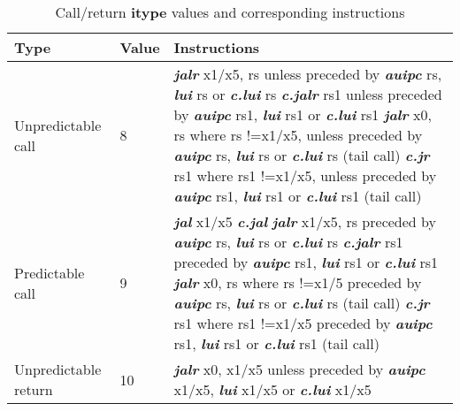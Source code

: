\begin{table}[htp]
    \centering
    \caption{Call/return \textbf{itype} values and corresponding instructions}
    \label{tab:itype}
    \begin{tabulary}{\textwidth}{|l|l|p{80mm}|}
        \hline
        \textbf {Type} & \textbf {Value} & \textbf {Instructions} \\
        \hline
        Unpredictable call & 8 & \textit{\textbf {jalr}} x1/x5, rs unless preceded by \textit{\textbf {auipc}} rs, \textit{\textbf {lui}} rs or \textit{\textbf {c.lui}} rs\newline
\textit{\textbf {c.jalr}} rs1 unless preceded by \textit{\textbf {auipc}} rs1, \textit{\textbf {lui}} rs1 or \textit{\textbf {c.lui}} rs1\newline
\textit{\textbf {jalr}} x0, rs where rs !=x1/x5, unless preceded by \textit{\textbf {auipc}} rs, \textit{\textbf {lui}} rs or \textit{\textbf {c.lui}} rs (tail call)\newline
\textit{\textbf {c.jr}} rs1 where rs1 !=x1/x5, unless preceded by \textit{\textbf {auipc}} rs1, \textit{\textbf {lui}} rs1 or \textit{\textbf {c.lui}} rs1 (tail call) \\
        \hline
        Predictable call & 9 & \textit{\textbf {jal}} x1/x5\newline
\textit{\textbf {c.jal}}\newline
\textit{\textbf {jalr}} x1/x5, rs preceded by \textit{\textbf {auipc}} rs, \textit{\textbf {lui}} rs or \textit{\textbf {c.lui}} rs\newline
\textit{\textbf {c.jalr}} rs1 preceded by \textit{\textbf {auipc}} rs1, \textit{\textbf {lui}} rs1 or \textit{\textbf {c.lui}} rs1\newline
\textit{\textbf {jalr}} x0, rs where rs !=x1/5 preceded by \textit{\textbf {auipc}} rs, \textit{\textbf {lui}} rs or \textit{\textbf {c.lui}} rs (tail call)\newline
\textit{\textbf {c.jr}} rs1 where rs1 !=x1/x5 preceded by \textit{\textbf {auipc}} rs1, \textit{\textbf {lui}} rs1 or \textit{\textbf {c.lui}} rs1 (tail call)\\
        \hline
        Unpredictable return & 10 & \textit{\textbf {jalr}} x0, x1/x5 unless preceded by \textit{\textbf {auipc}} x1/x5, \textit{\textbf {lui}} x1/x5 or \textit{\textbf {c.lui}} x1/x5\newline


\end{tabulary}
\end{table}
